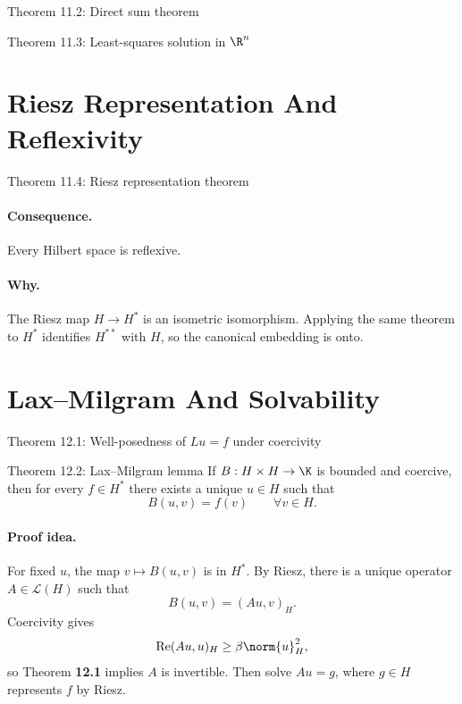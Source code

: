 \documentclass[11pt]{article}
\begin{document}
\begin{thmbox}{Theorem 11.2: Direct sum theorem}
\thmDirectSum
\end{thmbox}

\begin{thmbox}{Theorem 11.3: Least-squares solution in $\R^n$}
\thmLeastSquares
\end{thmbox}

\section{Riesz Representation And Reflexivity}

\begin{thmbox}{Theorem 11.4: Riesz representation theorem}
\thmRieszRepresentation
\end{thmbox}

\paragraph{Consequence.}
Every Hilbert space is reflexive.

\paragraph{Why.}
The Riesz map $H\to H^*$ is an isometric isomorphism. Applying the same theorem to $H^*$ identifies $H^{**}$ with $H$, so the canonical embedding is onto.

\section{Lax--Milgram And Solvability}

\begin{thmbox}{Theorem 12.1: Well-posedness of $Lu=f$ under coercivity}
\thmCoerciveBijective
\end{thmbox}

\begin{thmbox}{Theorem 12.2: Lax--Milgram lemma}
If $B:H\times H\to\K$ is bounded and coercive, then for every $f\in H^*$ there exists a unique $u\in H$ such that
\[
B(u,v)=f(v) \qquad \forall v\in H.
\]
\end{thmbox}

\paragraph{Proof idea.}
For fixed $u$, the map $v\mapsto B(u,v)$ is in $H^*$. By Riesz, there is a unique operator $A\in\mathcal L(H)$ such that
\[
B(u,v)=(Au,v)_H.
\]
Coercivity gives
\[
\operatorname{Re}(Au,u)_H\ge \beta\norm{u}_H^2,
\]
so Theorem \textbf{12.1} implies $A$ is invertible. Then solve $Au=g$, where $g\in H$ represents $f$ by Riesz.
\end{document}

